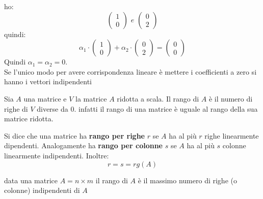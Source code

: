 \documentclass[a4paper,12pt, oneside]{book}
\begin{document}
\begin{esempio}
	ho:
	$$\left(\begin{matrix}
			1 \\
			0
		\end{matrix}\right) \,\, e \,\, \left(\begin{matrix}
			0 \\
			2
		\end{matrix}\right)$$
	quindi:
	$$\alpha_1\cdot \left(\begin{matrix}
			1 \\
			0
		\end{matrix}\right) + \alpha_2\cdot \left(\begin{matrix}
			0 \\
			2
		\end{matrix}\right)=
		\left(\begin{matrix}
			0 \\
			0
		\end{matrix}\right)$$
	Quindi $\alpha_1=\alpha_2=0$.\\
	Se l'unico modo per avere corrispondenza lineare è mettere i coefficienti a zero si hanno i vettori indipendenti
\end{esempio}
Sia $A$ una matrice e $V$ la matrice $A$ ridotta a scala. Il rango di $A$ è il numero di righe di $V$ diverse da 0. infatti il rango di una matrice è uguale al rango della sua matrice ridotta.
\begin{definizione}
	Si dice che una matrice ha \textbf{rango per righe} $r$ se $A$ ha al più $r$ righe linearmente dipendenti. Analogamente ha \textbf{rango per colonne} $s$ se $A$ ha al più $s$ colonne linearmente indipendenti. Inoltre:
	$$r=s=rg(A)$$
\end{definizione}
\begin{teorema}
	data una matrice $A=n\times m$ il rango di $A$ è il massimo numero di righe (o colonne) indipendenti di $A$
\end{teorema}
\end{document}
